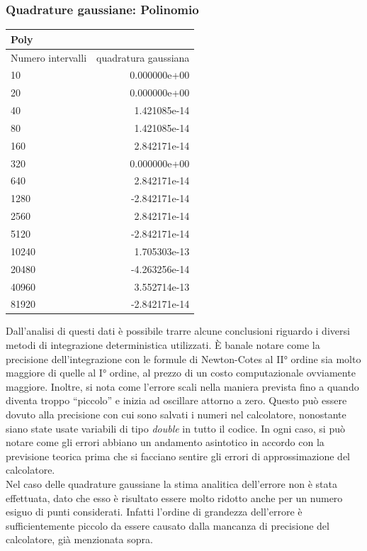 \subsubsection{Quadrature gaussiane: Polinomio}
\begin{center}
\begin{longtable}[h]{lr}
\toprule
Poly & \\
\midrule
Numero intervalli & quadratura gaussiana  \\
10	&0.000000e+00 \\
20&	0.000000e+00 \\ 
40&	1.421085e-14 \\
80&	1.421085e-14 \\
160&	2.842171e-14 \\
320&	0.000000e+00 \\
640&	2.842171e-14 \\
1280&	-2.842171e-14 \\ 
2560&	2.842171e-14 \\
5120&	-2.842171e-14 \\ 
10240&	1.705303e-13 \\
20480&	-4.263256e-14 \\
40960&	3.552714e-13 \\ 
81920&	-2.842171e-14 \\
\midrule

\bottomrule
\end{longtable}
 
\end{center}
Dall'analisi di questi dati è possibile trarre alcune conclusioni riguardo i diversi metodi di integrazione deterministica utilizzati.
È banale notare come la precisione dell'integrazione con le formule di Newton-Cotes al II° ordine sia molto maggiore di quelle al I° ordine, al prezzo di un costo computazionale ovviamente maggiore.
Inoltre, si nota come l'errore scali nella maniera prevista fino a quando diventa troppo ``piccolo'' e inizia ad oscillare attorno a zero.
Questo può essere dovuto alla precisione con cui sono salvati i numeri nel calcolatore, nonostante siano state usate variabili di tipo \emph{double} in tutto il codice.
In ogni caso, si può notare come gli errori abbiano un andamento asintotico in accordo con la previsione teorica prima che si facciano sentire gli errori di approssimazione del calcolatore.\\
Nel caso delle quadrature gaussiane la stima analitica dell'errore non è stata effettuata, dato che esso è risultato essere molto ridotto anche per un numero esiguo di punti considerati.
Infatti l'ordine di grandezza dell'errore è sufficientemente piccolo da essere causato dalla mancanza di precisione del calcolatore, già menzionata sopra.
 
